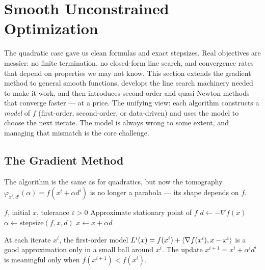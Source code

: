 \section{Smooth Unconstrained Optimization}\label{sec:smooth-methods}

The quadratic case gave us clean formulas and exact stepsizes.
Real objectives are messier: no finite termination, no closed-form line search, and convergence rates that depend on properties we may not know.
This section extends the gradient method to general smooth functions, develops the line search machinery needed to make it work, and then introduces second-order and quasi-Newton methods that converge faster --- at a price.
The unifying view: each algorithm constructs a \textit{model} of $f$ (first-order, second-order, or data-driven) and uses the model to choose the next iterate.
The model is always wrong to some extent, and managing that mismatch is the core challenge.


\subsection{The Gradient Method}\label{ssec:gradient-general}

The algorithm is the same as for quadratics, but now the tomography $\varphi_{x^i, d^i}(\alpha) = f(x^i + \alpha d^i)$ is no longer a parabola --- its shape depends on $f$.

\begin{algorithm}
	\caption{Gradient Method with Steepest Descent}
	\begin{algorithmic}[1]
		\Require $f$, initial $x$, tolerance $\varepsilon > 0$
		\Ensure Approximate stationary point of $f$
				\State $d \gets -\nabla f(x)$
				\State $\alpha \gets \mathrm{stepsize}(f, x, d)$
				\State $x \gets x + \alpha d$
			\EndWhile
		\EndProcedure
	\end{algorithmic}
\end{algorithm}

At each iterate $x^i$, the first-order model $L^i(x) = f(x^i) + \langle\nabla f(x^i), x - x^i\rangle$ is a good approximation only in a small ball around $x^i$.
The update $x^{i+1} = x^i + \alpha^i d^i$ is meaningful only when $f(x^{i+1}) < f(x^i)$.

